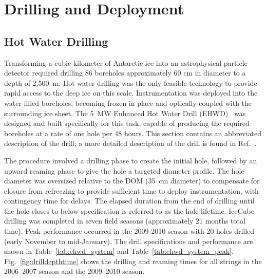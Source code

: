 
\section{\label{sec:drill-deploy}Drilling and Deployment}

\subsection{\label{sec:hot_water_drilling}Hot Water Drilling}

Transforming a cubic kilometer of Antarctic ice into an astrophysical
particle detector required drilling 86 boreholes
approximately 60 cm in diameter to a depth of 2,500~m. Hot water drilling
was the only
feasible technology to provide rapid access to the deep ice on this scale.
Instrumentation was deployed into the water-filled boreholes, becoming
frozen in place and optically
coupled with the surrounding ice sheet. The 5~MW Enhanced Hot Water Drill
(EHWD)~\cite{ehwd} was designed and built specifically for this task,
capable of producing the required boreholes at a rate of one hole per 48
hours. This section contains an abbreviated description of the drill; a more detailed description of the drill
is found in Ref.~\cite{ehwd}.

The procedure involved a drilling phase to create the initial hole,
followed by an upward reaming phase to give the 
hole a targeted diameter profile.  The hole diameter was oversized relative to
the DOM (35~cm diameter) to compensate for closure from refreezing to provide sufficient
time to deploy instrumentation, with contingency time for delays.  The
elapsed duration from the end of drilling until the hole closes to below
specification is referred to as the hole lifetime. IceCube drilling was
completed in seven field seasons (approximately 21 months total time).
Peak performance occurred in the 2009-2010 season with 20 holes drilled
(early November to mid-January).  The drill specifications and performance
are shown in Table~\ref{tab:ehwd_system} and
Table~\ref{tab:ehwd_system_peak}. Fig.~\ref{fig:drilldepthtime} shows the
drilling and reaming times for all strings in the 2006--2007 season and the
2009--2010 season.

\vspace{\baselineskip}

